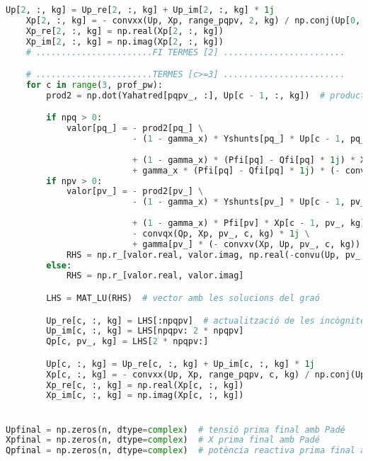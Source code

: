 \begin{lstlisting}[language=Python,numbers=none]
    Up[2, :, kg] = Up_re[2, :, kg] + Up_im[2, :, kg] * 1j
    Xp[2, :, kg] = - convxx(Up, Xp, range_pqpv, 2, kg) / np.conj(Up[0, :, kg])
    Xp_re[2, :, kg] = np.real(Xp[2, :, kg])
    Xp_im[2, :, kg] = np.imag(Xp[2, :, kg])
    # .......................FI TERMES [2] ........................

    # .......................TERMES [c>=3] ........................
    for c in range(3, prof_pw):
        prod2 = np.dot(Yahatred[pqpv_, :], Up[c - 1, :, kg])  # producte entre reduïda on files no sumen 0 i tensions dels PQ i PV

        if npq > 0:
            valor[pq_] = - prod2[pq_] \
                         - (1 - gamma_x) * Yshunts[pq_] * Up[c - 1, pq_, kg] * np.prod(abs(Us0[pq, :kg + 1]),
                                                                                       axis=1) ** 2 \
                         + (1 - gamma_x) * (Pfi[pq] - Qfi[pq] * 1j) * Xp[c - 1, pq_, kg] \
                         + gamma_x * (Pfi[pq] - Qfi[pq] * 1j) * (- convxv(Xp, Up, pq_, c, kg))
        if npv > 0:
            valor[pv_] = - prod2[pv_] \
                         - (1 - gamma_x) * Yshunts[pv_] * Up[c - 1, pv_, kg] * np.prod(abs(Us0[pv, :kg + 1]),
                                                                                       axis=1) ** 2 \
                         + (1 - gamma_x) * Pfi[pv] * Xp[c - 1, pv_, kg] \
                         - convqx(Qp, Xp, pv_, c, kg) * 1j \
                         + gamma[pv_] * (- convxv(Xp, Up, pv_, c, kg))
            RHS = np.r_[valor.real, valor.imag, np.real(-convu(Up, pv_, c, kg))]  # vector de la dreta del sistema d'equacions
        else:
            RHS = np.r_[valor.real, valor.imag]

        LHS = MAT_LU(RHS)  # vector amb les solucions del graó

        Up_re[c, :, kg] = LHS[:npqpv]  # actualització de les incògnites
        Up_im[c, :, kg] = LHS[npqpv: 2 * npqpv]
        Qp[c, pv_, kg] = LHS[2 * npqpv:]

        Up[c, :, kg] = Up_re[c, :, kg] + Up_im[c, :, kg] * 1j
        Xp[c, :, kg] = - convxx(Up, Xp, range_pqpv, c, kg) / np.conj(Up[0, :, kg])
        Xp_re[c, :, kg] = np.real(Xp[c, :, kg])
        Xp_im[c, :, kg] = np.imag(Xp[c, :, kg])


Upfinal = np.zeros(n, dtype=complex)  # tensió prima final amb Padé
Xpfinal = np.zeros(n, dtype=complex)  # X prima final amb Padé
Qpfinal = np.zeros(n, dtype=complex)  # potència reactiva prima final amb Padé


\end{lstlisting}
